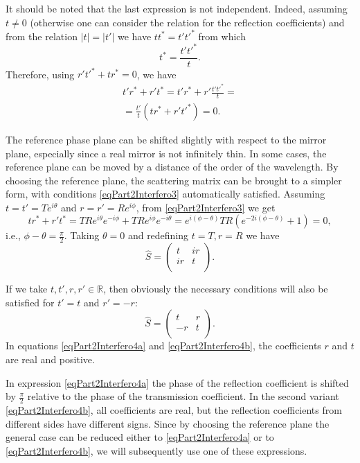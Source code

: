 It should be noted that the last expression is not independent. Indeed, assuming $t \ne 0$ (otherwise one can consider the relation for the reflection coefficients) and from the relation $\left|t\right| = \left|t'\right|$ we have
\(
t t^\ast = t' t'^\ast
\)
from which
\[
t^\ast = \frac{t' t'^\ast}{t}.
\]
Therefore, using $r' t'^\ast + t r^\ast = 0$, we have
\begin{eqnarray}
  t' r^\ast + r' t^\ast =
  t' r^\ast + r' \frac{t' t'^\ast}{t} =
  \nonumber \\
  = \frac{t'}{t}\left(t r^\ast + r't'^\ast\right) = 0.
  \nonumber
\end{eqnarray}

The reference phase plane can be shifted slightly with respect to the mirror plane, especially since a real mirror is not infinitely thin. In some cases, the reference plane can be moved by a distance of the order of the wavelength. By choosing the reference plane, the scattering matrix can be brought to a simpler form, with conditions 
\eqref{eqPart2Interfero3} automatically satisfied.
Assuming $t = t' = T e^{i \theta}$ and $r = r' = R e^{i \phi}$, from
\eqref{eqPart2Interfero3} we get
\[
t r^\ast + r' t^\ast = TR e^{ i \theta} e^{- i \phi} + TR e^{ i \phi}
e^{- i \theta} =
e^{i (\phi-\theta)} TR \left(e^{-2 i (\phi-\theta)} + 1\right) = 0,
\]
i.e., $\phi - \theta = \frac{\pi}{2}$. Taking $\theta = 0$ and redefining $t = T, r = R$ we have
\begin{equation}
\hat{S} = \left(
\begin{array}{cc}
t & i r \\
i r & t \\
\end{array}
\right).
\label{eqPart2Interfero4a}
\end{equation}

If we take $t,t',r,r' \in \mathbb{R}$, then obviously the necessary conditions will also be satisfied for $t' = t$ and $r' = -r$:
\begin{equation}
\hat{S} = \left(
\begin{array}{cc}
t & r \\
-r & t \\
\end{array}
\right).
\label{eqPart2Interfero4b}
\end{equation}
In equations \eqref{eqPart2Interfero4a} and \eqref{eqPart2Interfero4b},
the coefficients $r$ and $t$ are real and positive.

In expression \eqref{eqPart2Interfero4a} the phase of the reflection coefficient is shifted by $\frac{\pi}{2}$ relative to the phase of the transmission coefficient. In the second variant \eqref{eqPart2Interfero4b}, all coefficients are real, but the reflection coefficients from different sides have different signs. Since by choosing the reference plane the general case can be reduced either to \eqref{eqPart2Interfero4a} or to \eqref{eqPart2Interfero4b}, we will subsequently use one of these expressions.

